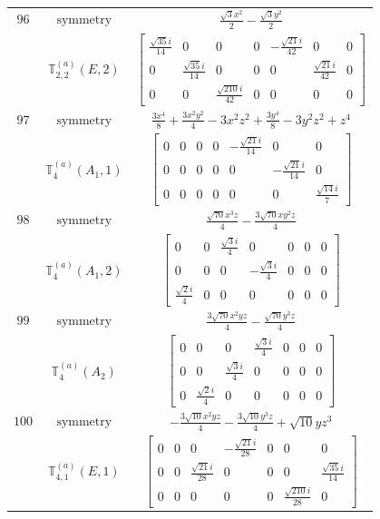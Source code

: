 \documentclass[fleqn,8pt,landscape]{jsarticle}
\begin{document}
\begin{longtable}{ccc}
$ 96 $ & $ \text{symmetry} $ & $ \frac{\sqrt{3} x^{2}}{2} - \frac{\sqrt{3} y^{2}}{2} $ \\
$  $ & $ \mathbb{T}_{2,2}^{(a)}(E,2) $ & $ \begin{bmatrix} \frac{\sqrt{35} i}{14} & 0 & 0 & 0 & - \frac{\sqrt{21} i}{42} & 0 & 0 \\ 0 & \frac{\sqrt{35} i}{14} & 0 & 0 & 0 & \frac{\sqrt{21} i}{42} & 0 \\ 0 & 0 & \frac{\sqrt{210} i}{42} & 0 & 0 & 0 & 0 \end{bmatrix} $ \\ \hline
$ 97 $ & $ \text{symmetry} $ & $ \frac{3 x^{4}}{8} + \frac{3 x^{2} y^{2}}{4} - 3 x^{2} z^{2} + \frac{3 y^{4}}{8} - 3 y^{2} z^{2} + z^{4} $ \\
$  $ & $ \mathbb{T}_{4}^{(a)}(A_{1},1) $ & $ \begin{bmatrix} 0 & 0 & 0 & 0 & - \frac{\sqrt{21} i}{14} & 0 & 0 \\ 0 & 0 & 0 & 0 & 0 & - \frac{\sqrt{21} i}{14} & 0 \\ 0 & 0 & 0 & 0 & 0 & 0 & \frac{\sqrt{14} i}{7} \end{bmatrix} $ \\ \hline
$ 98 $ & $ \text{symmetry} $ & $ \frac{\sqrt{70} x^{3} z}{4} - \frac{3 \sqrt{70} x y^{2} z}{4} $ \\
$  $ & $ \mathbb{T}_{4}^{(a)}(A_{1},2) $ & $ \begin{bmatrix} 0 & 0 & \frac{\sqrt{3} i}{4} & 0 & 0 & 0 & 0 \\ 0 & 0 & 0 & - \frac{\sqrt{3} i}{4} & 0 & 0 & 0 \\ \frac{\sqrt{2} i}{4} & 0 & 0 & 0 & 0 & 0 & 0 \end{bmatrix} $ \\ \hline
$ 99 $ & $ \text{symmetry} $ & $ \frac{3 \sqrt{70} x^{2} y z}{4} - \frac{\sqrt{70} y^{3} z}{4} $ \\
$  $ & $ \mathbb{T}_{4}^{(a)}(A_{2}) $ & $ \begin{bmatrix} 0 & 0 & 0 & \frac{\sqrt{3} i}{4} & 0 & 0 & 0 \\ 0 & 0 & \frac{\sqrt{3} i}{4} & 0 & 0 & 0 & 0 \\ 0 & \frac{\sqrt{2} i}{4} & 0 & 0 & 0 & 0 & 0 \end{bmatrix} $ \\ \hline
$ 100 $ & $ \text{symmetry} $ & $ - \frac{3 \sqrt{10} x^{2} y z}{4} - \frac{3 \sqrt{10} y^{3} z}{4} + \sqrt{10} y z^{3} $ \\
$  $ & $ \mathbb{T}_{4,1}^{(a)}(E,1) $ & $ \begin{bmatrix} 0 & 0 & 0 & - \frac{\sqrt{21} i}{28} & 0 & 0 & 0 \\ 0 & 0 & \frac{\sqrt{21} i}{28} & 0 & 0 & 0 & \frac{\sqrt{35} i}{14} \\ 0 & 0 & 0 & 0 & 0 & \frac{\sqrt{210} i}{28} & 0 \end{bmatrix} $ \\ \hline

\end{longtable}
\end{document}
